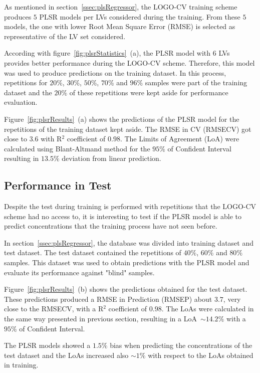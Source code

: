 \documentclass[journal,twoside,web]{ieeecolor}
\begin{document}
As mentioned in section~\ref{ssec:plsRegressor}, the LOGO-CV training scheme produces $5$ PLSR models per LVs considered during the training. From these $5$ models, the one with lower Root Mean Square Error (RMSE) is selected as representative of the LV set considered.

According with figure~\ref{fig:plsrStatistics}~(a), the PLSR model with $6$ LVs provides better performance during the LOGO-CV scheme. Therefore, this model was used to produce predictions on the training dataset. In this process, repetitions for $20\%$, $30\%$, $50\%$, $70\%$ and $96\%$ samples were part of the training dataset and the $20\%$ of these repetitions were kept aside for performance evaluation.

Figure~\ref{fig:plsrResults}~(a) shows the predictions of the PLSR model for the repetitions of the training dataset kept aside. The RMSE in CV (RMSECV) got close to $3.6$ with R$^{2}$ coefficient of $0.98$. The Limits of Agreement (LoA) were calculated using Blant-Altmand method for the $95\%$ of Confident Interval resulting in $13.5\%$ deviation from linear prediction.
 
\subsection{Performance in Test}
\label{ssec:perfTest}

Despite the test during training is performed with repetitions that the LOGO-CV scheme had no access to, it is interesting to test if the PLSR model is able to predict concentrations that the training process have not seen before. 

In section~\ref{ssec:plsRegressor}, the database was divided into training dataset and test dataset. The test dataset contained the repetitions of $40\%$, $60\%$ and $80\%$ samples. This dataset was used to obtain predictions with the PLSR model and evaluate its performance against "blind" samples.

Figure~\ref{fig:plsrResults}~(b) shows the predictions obtained for the test dataset. These predictions produced a RMSE in Prediction (RMSEP) about $3.7$, very close to the RMSECV, with a R$^{2}$ coefficient of $0.98$. The LoAs were calculated in the same way presented in previous section, resulting in a LoA~$\sim14.2\%$ with a $95\%$ of Confident Interval. 

The PLSR models showed a $1.5\%$ bias when predicting the concentrations of the test dataset and the LoAs increased also $\sim1\%$ with respect to the LoAs obtained in training. 
\end{document}
